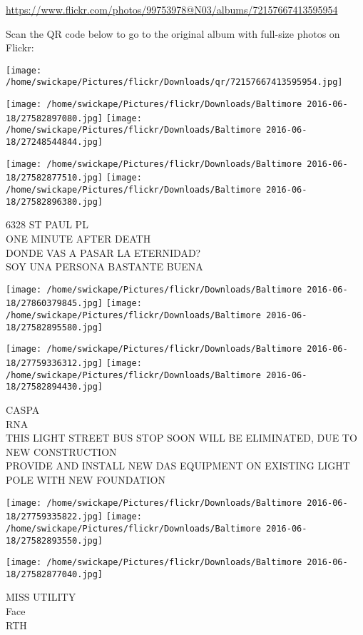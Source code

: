 \documentclass[10pt,letterpaper]{article}
\begin{document}
\url{https://www.flickr.com/photos/99753978@N03/albums/72157667413595954}

Scan the QR code below to go to the original album with full-size photos on Flickr:

\texttt{[image: /home/swickape/Pictures/flickr/Downloads/qr/72157667413595954.jpg]}
\pagebreak

\texttt{[image: /home/swickape/Pictures/flickr/Downloads/Baltimore 2016-06-18/27582897080.jpg]}
\texttt{[image: /home/swickape/Pictures/flickr/Downloads/Baltimore 2016-06-18/27248544844.jpg]}

\texttt{[image: /home/swickape/Pictures/flickr/Downloads/Baltimore 2016-06-18/27582877510.jpg]}
\texttt{[image: /home/swickape/Pictures/flickr/Downloads/Baltimore 2016-06-18/27582896380.jpg]}

6328 ST PAUL PL\\
ONE MINUTE AFTER DEATH\\
DONDE VAS A PASAR LA ETERNIDAD?\\
SOY UNA PERSONA BASTANTE BUENA
\pagebreak

\texttt{[image: /home/swickape/Pictures/flickr/Downloads/Baltimore 2016-06-18/27860379845.jpg]}
\texttt{[image: /home/swickape/Pictures/flickr/Downloads/Baltimore 2016-06-18/27582895580.jpg]}

\texttt{[image: /home/swickape/Pictures/flickr/Downloads/Baltimore 2016-06-18/27759336312.jpg]}
\texttt{[image: /home/swickape/Pictures/flickr/Downloads/Baltimore 2016-06-18/27582894430.jpg]}

CASPA\\
RNA\\
THIS LIGHT STREET BUS STOP SOON WILL BE ELIMINATED, DUE TO NEW CONSTRUCTION\\
PROVIDE AND INSTALL NEW DAS EQUIPMENT ON EXISTING LIGHT POLE WITH NEW FOUNDATION
\pagebreak

\texttt{[image: /home/swickape/Pictures/flickr/Downloads/Baltimore 2016-06-18/27759335822.jpg]}
\texttt{[image: /home/swickape/Pictures/flickr/Downloads/Baltimore 2016-06-18/27582893550.jpg]}

\texttt{[image: /home/swickape/Pictures/flickr/Downloads/Baltimore 2016-06-18/27582877040.jpg]}

MISS UTILITY\\
Face\\
RTH
\pagebreak
\end{document}
